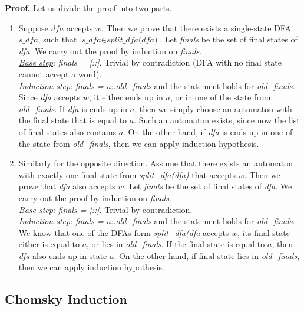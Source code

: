 \textbf{Proof.}
Let us divide the proof into two parts.
\begin{enumerate}
\item Suppose $\textit{dfa}$ accepts $w$. Then we prove that there exists a single-state DFA $\textit{s\_dfa}$, such that $\textit{s\_dfa} \in \textit{split\_dfa(dfa)}$. 
Let \textit{finals} be the set of final states of \textit{dfa}. We carry out the proof by induction on \textit{finals}. 
\\
\textit{\underline{Base step}}: \textit{finals = [::]}. Trivial by contradiction (DFA with no final state cannot accept a word).
\\
\textit{\underline{Induction step}}: \textit{finals = a::old\_finals} and the statement holds for \textit{old\_finals}. Since \textit{dfa} accepts $w$, it either ends up in $a$, or in one of the state from \textit{old\_finals}.
If \textit{dfa} is ends up in $a$, then we simply choose an automaton with the final state that is equal to $a$.
Such an automaton exists, since now the list of final states also contains $a$.
On the other hand, if \textit{dfa} is ends up in one of the state from \textit{old\_finals}, then we can apply induction hypothesis.

\item Similarly for the opposite direction. Assume that there exists an automaton with exactly one final state from \textit{split\_dfa(dfa)} that accepts $w$. Then we prove that \textit{dfa} also accepts $w$. 
Let \textit{finals} be the set of final states of \textit{dfa}. We carry out the proof by induction on \textit{finals}. 
\\
\textit{\underline{Base step}}: \textit{finals = [::]}. Trivial by contradiction.
\\
\textit{\underline{Induction step}}: \textit{finals = a::old\_finals} and the statement holds for \textit{old\_finals}.
We know that one of the DFAs form \textit{split\_dfa(dfa} accepts $w$, its final state either is equal to $a$, or lies in \textit{old\_finals}.
If the final state is equal to $a$, then \textit{dfa} also ends up in state $a$.
On the other hand, if final state lies in \textit{old\_finals}, then we can apply induction hypothesis.
\end{enumerate}


\subsection{Chomsky Induction}
\label{sec:chomsky-induction}

